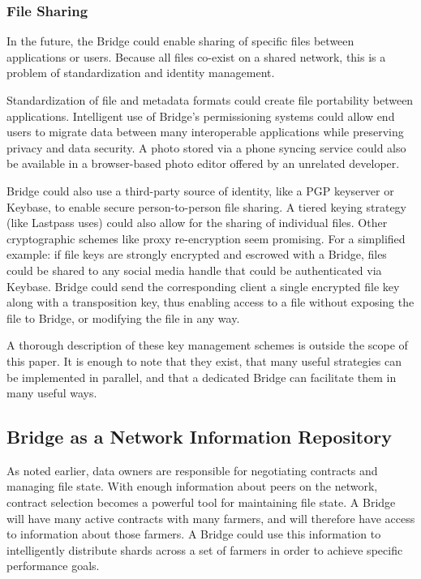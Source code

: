 \documentclass[a4paper,10pt]{article}
\begin{document}
\subsubsection{File Sharing}
In the future, the Bridge could enable sharing of specific files between applications or users. Because all files co-exist on a shared network, this is a problem of standardization and identity management.

Standardization of file and metadata formats could create file portability between applications. Intelligent use of Bridge’s permissioning systems could allow end users to migrate data between many interoperable applications while preserving privacy and data security. A photo stored via a phone syncing service could also be available in a browser-based photo editor offered by an unrelated developer.

Bridge could also use a third-party source of identity, like a PGP keyserver or Keybase, to enable secure person-to-person file sharing. A tiered keying strategy (like Lastpass uses) could also allow for the sharing of individual files. Other cryptographic schemes like proxy re-encryption seem promising. For a simplified example: if file keys are strongly encrypted and escrowed with a Bridge, files could be shared to any social media handle that could be authenticated via Keybase. Bridge could send the corresponding client a single encrypted file key along with a transposition key, thus enabling access to a file without exposing the file to Bridge, or modifying the file in any way.

A thorough description of these key management schemes is outside the scope of this paper. It is enough to note that they exist, that many useful strategies can be implemented in parallel, and that a dedicated Bridge can facilitate them in many useful ways.

\subsection{Bridge as a Network Information Repository}
As noted earlier, data owners are responsible for negotiating contracts and managing file state. With enough information about peers on the network, contract selection becomes a powerful tool for maintaining file state. A Bridge will have many active contracts with many farmers, and will therefore have access to information about those farmers. A Bridge could use this information to intelligently distribute shards across a set of farmers in order to achieve specific performance goals.
\end{document}
